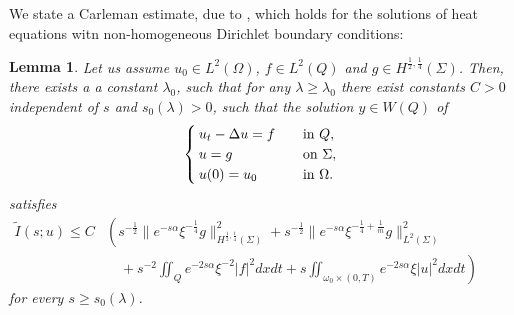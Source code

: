 \documentclass[preprint,10pt]{article}
\newtheorem{lemma}[theorem]{Lemma}
\numberwithin{equation}{section}
\numberwithin{theorem}{section}
\begin{document}
{We state a Carleman estimate, due to \cite{ima_yama_puel}, which holds for the solutions of heat equations witn non-homogeneous Dirichlet boundary conditions:
%
\begin{lemma}
Let us assume $u_0\in L^2(\Omega)$, $f\in L^2(Q)$ and $g\in H^{\frac{1}{2},\frac{1}{4}}(\Sigma)$. Then, there exists a a constant $\lambda_0$, such that for any $\lambda\geq \lambda_0$ there exist constants $C>0$ independent of $s$ and $s_0(\lambda)>0$, such that the solution $y\in W(Q)$ of 
%
\begin{equation}
\begin{cases}
u_t-\Delta u=f \quad& \textnormal{in } Q, \\
u=g \quad& \textnormal{on } \Sigma, \\
u(0)=u_0 \quad& \textnormal{in } \Omega. 
\end{cases}
\end{equation}
%
satisfies
%
\begin{equation}\label{car_boundary}
\begin{split}
\widetilde I(s;u)\leq C&\left(s^{-\frac{1}{2}}\|e^{-s\alpha}\xi^{-\frac{1}{4}}g \|_{H^{\frac{1}{2},\frac{1}{4}}(\Sigma)}^2+s^{-\frac{1}{2}}\|e^{-s\alpha}\xi^{-\frac{1}{4}+\frac{1}{m}}g\|^2_{L^2(\Sigma)}\phantom{\iint_{\omega\times(0,T)}}\right. \\
&\left.\quad+s^{-2}\iint_Qe^{-2s\alpha}\xi^{-2}|f|^2dxdt+s\iint_{\omega_0\times(0,T)}e^{-2s\alpha}\xi|u|^2dxdt\right)
\end{split}
\end{equation}
%
for every $s\geq s_0(\lambda)$. 
\end{lemma}

}
\end{document}
